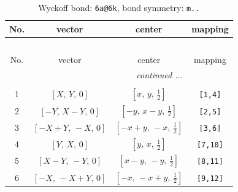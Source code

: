 \documentclass[fleqn,8pt]{jsarticle}
\begin{document}
\begin{longtable}{cccc}
\caption{Wyckoff bond: {\tt 6a@6k}, bond symmetry: {\tt m..}}
 \\
 \hline \hline
No. & vector & center & mapping \\ \hline \endfirsthead

\multicolumn{3}{l}{\tablename\ \thetable{}} \\
 \hline \hline
No. & vector & center & mapping \\ \hline \endhead

 \hline \hline
\multicolumn{3}{r}{\footnotesize\it continued ...} \\ \endfoot

 \hline \hline
\multicolumn{3}{r}{} \\ \endlastfoot

1 & $\left[ X,\, Y,\, 0 \right]$ & $\left[ x,\, y,\, \frac{1}{2} \right]$ & {\tt [1,4]} \\ \hline
2 & $\left[ - Y,\, X - Y,\, 0 \right]$ & $\left[ - y,\, x - y,\, \frac{1}{2} \right]$ & {\tt [2,5]} \\ \hline
3 & $\left[ - X + Y,\, - X,\, 0 \right]$ & $\left[ - x + y,\, - x,\, \frac{1}{2} \right]$ & {\tt [3,6]} \\ \hline
4 & $\left[ Y,\, X,\, 0 \right]$ & $\left[ y,\, x,\, \frac{1}{2} \right]$ & {\tt [7,10]} \\ \hline
5 & $\left[ X - Y,\, - Y,\, 0 \right]$ & $\left[ x - y,\, - y,\, \frac{1}{2} \right]$ & {\tt [8,11]} \\ \hline
6 & $\left[ - X,\, - X + Y,\, 0 \right]$ & $\left[ - x,\, - x + y,\, \frac{1}{2} \right]$ & {\tt [9,12]} \\
\end{longtable}
\renewcommand{\arraystretch}{1.2}
\end{document}
